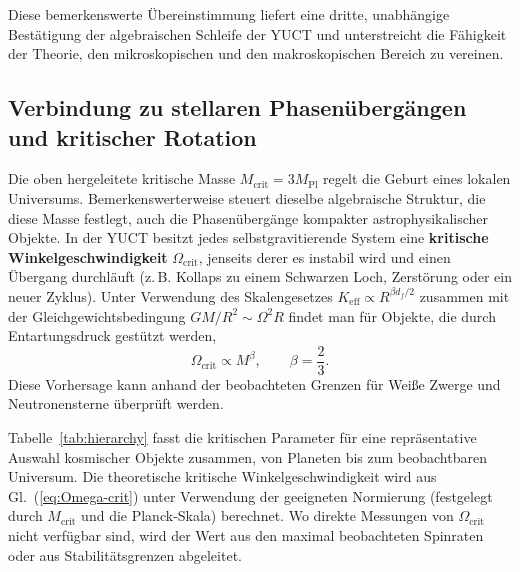 \documentclass[11pt,a4paper]{article}
\newcommand{\Keff}{K_{\mathrm{eff}}}
\begin{document}
	Diese bemerkenswerte Übereinstimmung liefert eine dritte, unabhängige Bestätigung der algebraischen Schleife der YUCT und unterstreicht die Fähigkeit der Theorie, den mikroskopischen und den makroskopischen Bereich zu vereinen.
	
	\subsection{Verbindung zu stellaren Phasenübergängen und kritischer Rotation}
	
	Die oben hergeleitete kritische Masse \(M_{\mathrm{crit}} = 3M_{\mathrm{Pl}}\) regelt die Geburt eines lokalen Universums. Bemerkenswerterweise steuert dieselbe algebraische Struktur, die diese Masse festlegt, auch die Phasenübergänge kompakter astrophysikalischer Objekte. In der YUCT besitzt jedes selbstgravitierende System eine \textbf{kritische Winkelgeschwindigkeit} \(\Omega_{\mathrm{crit}}\), jenseits derer es instabil wird und einen Übergang durchläuft (z. B. Kollaps zu einem Schwarzen Loch, Zerstörung oder ein neuer Zyklus). Unter Verwendung des Skalengesetzes \(\Keff \propto R^{\beta d_f/2}\) zusammen mit der Gleichgewichtsbedingung \(GM/R^2 \sim \Omega^2 R\) findet man für Objekte, die durch Entartungsdruck gestützt werden,
	\begin{equation}
		\Omega_{\mathrm{crit}} \propto M^{\beta}, \qquad \beta = \frac{2}{3}.
		\label{eq:Omega-crit}
	\end{equation}
	Diese Vorhersage kann anhand der beobachteten Grenzen für Weiße Zwerge und Neutronensterne überprüft werden.
	
	Tabelle~\ref{tab:hierarchy} fasst die kritischen Parameter für eine repräsentative Auswahl kosmischer Objekte zusammen, von Planeten bis zum beobachtbaren Universum. Die theoretische kritische Winkelgeschwindigkeit wird aus Gl.~(\ref{eq:Omega-crit}) unter Verwendung der geeigneten Normierung (festgelegt durch \(M_{\mathrm{crit}}\) und die Planck‑Skala) berechnet. Wo direkte Messungen von \(\Omega_{\mathrm{crit}}\) nicht verfügbar sind, wird der Wert aus den maximal beobachteten Spinraten oder aus Stabilitätsgrenzen abgeleitet.
	
\end{document}
